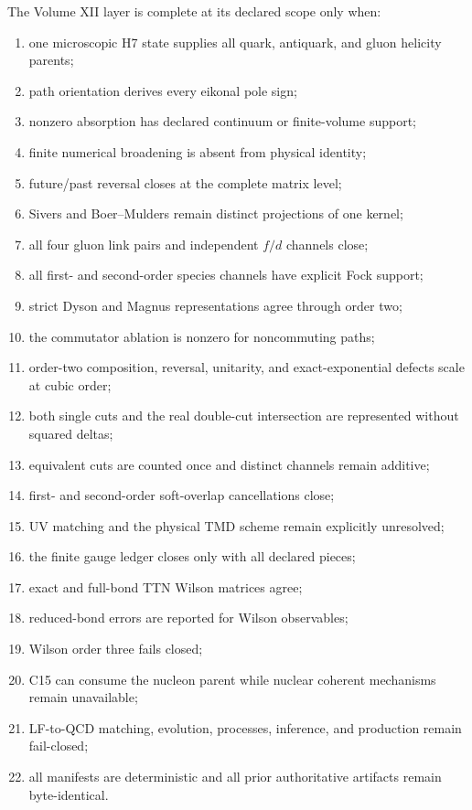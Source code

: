 \documentclass[11pt]{article}
\begin{document}
The Volume XII layer is complete at its declared scope only when:
\begin{enumerate}
 \item one microscopic H7 state supplies all quark, antiquark, and gluon
 helicity parents;
 \item path orientation derives every eikonal pole sign;
 \item nonzero absorption has declared continuum or finite-volume support;
 \item finite numerical broadening is absent from physical identity;
 \item future/past reversal closes at the complete matrix level;
 \item Sivers and Boer--Mulders remain distinct projections of one kernel;
 \item all four gluon link pairs and independent \(f/d\) channels close;
 \item all first- and second-order species channels have explicit Fock support;
 \item strict Dyson and Magnus representations agree through order two;
 \item the commutator ablation is nonzero for noncommuting paths;
 \item order-two composition, reversal, unitarity, and exact-exponential defects
 scale at cubic order;
 \item both single cuts and the real double-cut intersection are represented
 without squared deltas;
 \item equivalent cuts are counted once and distinct channels remain additive;
 \item first- and second-order soft-overlap cancellations close;
 \item UV matching and the physical TMD scheme remain explicitly unresolved;
 \item the finite gauge ledger closes only with all declared pieces;
 \item exact and full-bond TTN Wilson matrices agree;
 \item reduced-bond errors are reported for Wilson observables;
 \item Wilson order three fails closed;
 \item C15 can consume the nucleon parent while nuclear coherent mechanisms
 remain unavailable;
 \item LF-to-QCD matching, evolution, processes, inference, and production
 remain fail-closed;
 \item all manifests are deterministic and all prior authoritative artifacts
 remain byte-identical.
\end{enumerate}
\end{document}
